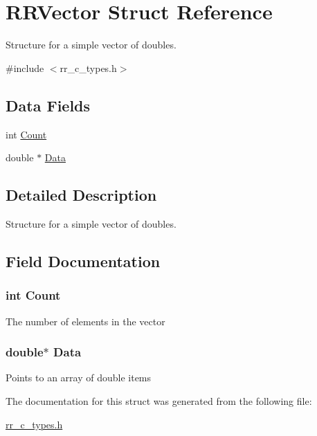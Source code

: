 \hypertarget{struct_r_r_vector}{
\section{\-R\-R\-Vector \-Struct \-Reference}
\label{struct_r_r_vector}
}


\-Structure for a simple vector of doubles.  




{\ttfamily \#include $<$rr\-\_\-c\-\_\-types.\-h$>$}

\subsection*{\-Data \-Fields}
\begin{DoxyCompactItemize}
\item 
int \hyperlink{struct_r_r_vector_aad462966ed963f892117056de1eba502}{\-Count}
\item 
double $\ast$ \hyperlink{struct_r_r_vector_a7c5cbda3aa940f4b0d6e8a1679307dfc}{\-Data}
\end{DoxyCompactItemize}


\subsection{\-Detailed \-Description}
\-Structure for a simple vector of doubles. 

\subsection{\-Field \-Documentation}
\hypertarget{struct_r_r_vector_aad462966ed963f892117056de1eba502}{
\subsubsection[{\-Count}]{\setlength{\rightskip}{0pt plus 5cm}int {\bf \-Count}}}
\label{struct_r_r_vector_aad462966ed963f892117056de1eba502}
\-The number of elements in the vector \hypertarget{struct_r_r_vector_a7c5cbda3aa940f4b0d6e8a1679307dfc}{
\subsubsection[{\-Data}]{\setlength{\rightskip}{0pt plus 5cm}double$\ast$ {\bf \-Data}}}
\label{struct_r_r_vector_a7c5cbda3aa940f4b0d6e8a1679307dfc}
\-Points to an array of double items 

\-The documentation for this struct was generated from the following file\-:\begin{DoxyCompactItemize}
\item 
\hyperlink{rr__c__types_8h}{rr\-\_\-c\-\_\-types.\-h}\end{DoxyCompactItemize}
